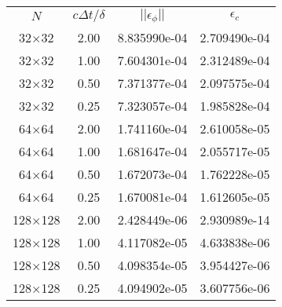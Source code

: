 \begin{tabular}{cccc}
     $N$ & $c\Delta t/\delta$  & $||\epsilon_{\phi}||$ & $\epsilon_{c}$  \\
32$\times$32 & 2.00 & 8.835990e-04 & 2.709490e-04  \\
32$\times$32 & 1.00 & 7.604301e-04 & 2.312489e-04  \\
32$\times$32 & 0.50 & 7.371377e-04 & 2.097575e-04  \\
32$\times$32 & 0.25 & 7.323057e-04 & 1.985828e-04  \\
64$\times$64 & 2.00 & 1.741160e-04 & 2.610058e-05  \\
64$\times$64 & 1.00 & 1.681647e-04 & 2.055717e-05  \\
64$\times$64 & 0.50 & 1.672073e-04 & 1.762228e-05  \\
64$\times$64 & 0.25 & 1.670081e-04 & 1.612605e-05  \\
128$\times$128 & 2.00 & 2.428449e-06 & 2.930989e-14  \\
128$\times$128 & 1.00 & 4.117082e-05 & 4.633838e-06  \\
128$\times$128 & 0.50 & 4.098354e-05 & 3.954427e-06  \\
128$\times$128 & 0.25 & 4.094902e-05 & 3.607756e-06  \\
\end{tabular}
